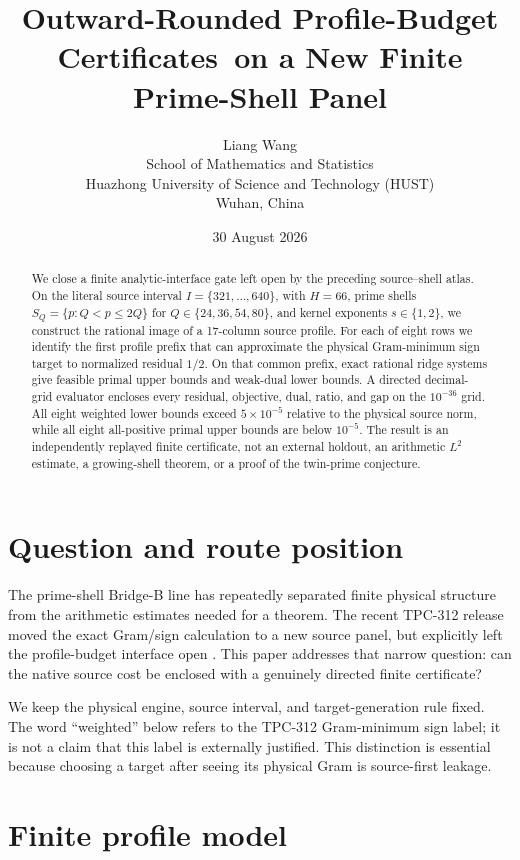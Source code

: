 \documentclass[10pt,a4paper]{article}
\title{Outward-Rounded Profile-Budget Certificates\
       on a New Finite Prime-Shell Panel}
\author{Liang Wang\\
School of Mathematics and Statistics\\
Huazhong University of Science and Technology (HUST)\\
Wuhan, China}
\date{30 August 2026}
\begin{document}
\maketitle

\begin{abstract}
We close a finite analytic-interface gate left open by the preceding
source--shell atlas.  On the literal source interval
$I=\{321,\ldots,640\}$, with $H=66$, prime shells
$S_Q=\{p:Q<p\leq2Q\}$ for $Q\in\{24,36,54,80\}$, and kernel exponents
$s\in\{1,2\}$, we construct the rational image of a 17-column source
profile.  For each of eight rows we identify the first profile prefix that
can approximate the physical Gram-minimum sign target to normalized residual
$1/2$.  On that common prefix, exact rational ridge systems give feasible
primal upper bounds and weak-dual lower bounds.  A directed decimal-grid
evaluator encloses every residual, objective, dual, ratio, and gap on the
$10^{-36}$ grid.  All eight weighted lower bounds exceed $5\times10^{-5}$
relative to the physical source norm, while all eight all-positive primal
upper bounds are below $10^{-5}$.  The result is an independently replayed
finite certificate, not an external holdout, an arithmetic $L^2$ estimate, a
growing-shell theorem, or a proof of the twin-prime conjecture.
\end{abstract}

\section{Question and route position}

The prime-shell Bridge-B line has repeatedly separated finite physical
structure from the arithmetic estimates needed for a theorem.  The recent
TPC-312 release moved the exact Gram/sign calculation to a new source panel,
but explicitly left the profile-budget interface open \cite{tpc312}.  This
paper addresses that narrow question: can the native source cost be enclosed
with a genuinely directed finite certificate?

We keep the physical engine, source interval, and target-generation rule
fixed.  The word ``weighted'' below refers to the TPC-312 Gram-minimum sign
label; it is not a claim that this label is externally justified.  This
distinction is essential because choosing a target after seeing its physical
Gram is source-first leakage.

\section{Finite profile model}
\end{document}
